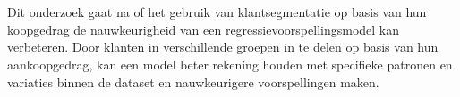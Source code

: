 
%
%
%
%
%

%


 
\chapter*{}


Dit onderzoek gaat na of het gebruik van klantsegmentatie op basis van hun koopgedrag de nauwkeurigheid van een regressievoorspellingsmodel kan verbeteren. Door klanten in verschillende groepen in te delen op basis van hun aankoopgedrag, kan een model beter rekening houden met specifieke patronen en variaties binnen de dataset en nauwkeurigere voorspellingen maken.

